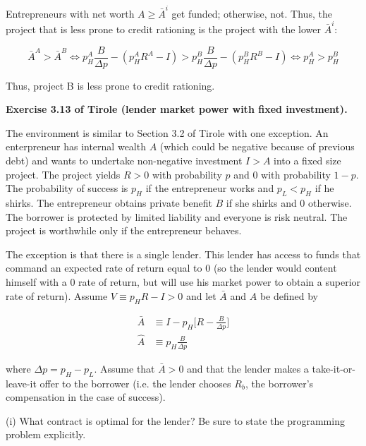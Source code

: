 \documentclass{article}
\begin{document}
Entrepreneurs with net worth $A \ge \bar{A}^i$ get funded; otherwise, not.  Thus, the project that is less prone to credit rationing is the project with the lower $\bar{A}^i$:

$$
\bar{A}^A > \bar{A}^B 
\iff 
p^A_H \frac{B}{\Delta p } - (p^A_H R^A - I) > p^B_H \frac{B}{\Delta p } - (p^B_H R^B - I)
\iff
p^A_H  > p^B_H 
$$

Thus, project B is less prone to credit rationing.

\pagebreak

\textbf{Exercise 3.13 of Tirole (lender market power with fixed investment).} 

\bigskip

The environment is similar to Section 3.2 of Tirole with one exception. An enterpreneur has internal wealth $A$ (which could be negative because of previous debt) and wants to undertake non-negative investment $I > A$ into a fixed size project. The project yields $R > 0$ with probability $p$ and 0 with probability $1 - p$. The probability of success is $p_H$ if the entrepreneur works and $p_L < p_H$ if he shirks. The entrepreneur obtains private benefit $B$ if she shirks and 0 otherwise. The borrower is protected by limited liability and everyone is risk neutral. The project is worthwhile only if the entrepreneur behaves.

\bigskip

The exception is that there is a single lender. This lender has access to funds that command an expected rate of return equal to 0 (so the lender would content himself with a 0 rate of return, but will use his market power to obtain a superior rate of return). Assume $V \equiv p_HR - I > 0$ and let $\bar{A}$ and $\hat{A}$ be defined by

\begin{align*}
\bar{A} &\equiv I - p_H \Bigg[R - \frac{B}{\Delta p}\Bigg] \\
\hat{A} &\equiv p_H \frac{B}{\Delta p}
\end{align*}

where $\Delta p = p_H - p_L$. Assume that $\bar{A} > 0$ and that the lender makes a take-it-or-leave-it offer to the borrower (i.e. the lender chooses $R_b$, the borrower's compensation in the case of success).

\bigskip

(i) What contract is optimal for the lender? Be sure to state the programming problem explicitly.

\bigskip
\end{document}
